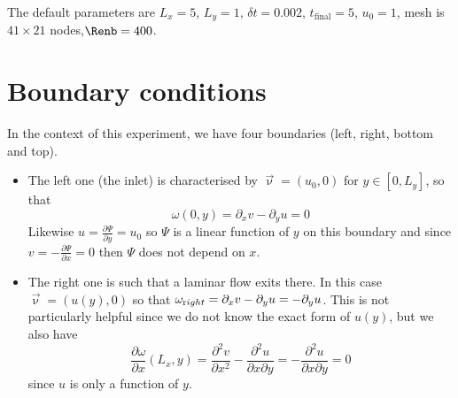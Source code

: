The default parameters are $L_x=5$, $L_y=1$, $\delta t=0.002$, $t_{\text{final}}=5$,
$u_0=1$, mesh is $41\times 21$ nodes,$\Renb=400$.

\section*{Boundary conditions}


In the context of this experiment, we have four boundaries (left, right, bottom and top). 
\begin{itemize}

\item The left one (the inlet) is characterised by $\vec\upnu=(u_0,0)$ for $y\in[0,L_y]$, so that 
\begin{equation}
\omega(0,y) = \partial_x v-\partial_y u = 0
\label{eq:omega1}
\end{equation}
Likewise $u=\frac{\partial \Psi}{\partial y}=u_0$ so $\Psi$ is a linear function of $y$ on this boundary and since $v=-\frac{\partial \Psi}{\partial x}=0$ then $\Psi$ does not depend on $x$. 

\item The right one is such that a laminar flow exits there. In this case $\vec\upnu=(u(y),0)$ so that
$\omega_{\text right} = \partial_x v-\partial_y u = -\partial_y u $. This is not particularly helpful since we do not know the exact form of $u(y)$, but we also have 
\begin{equation}
\frac{\partial \omega }{\partial x}(L_x,y) =
\frac{\partial^2 v}{\partial x^2}
-\frac{\partial^2 u}{\partial x\partial y}
= -\frac{\partial^2 u}{\partial x\partial y} =0
\label{eq:omega2}
\end{equation}
since $u$ is only a function of $y$.


\end{itemize}
